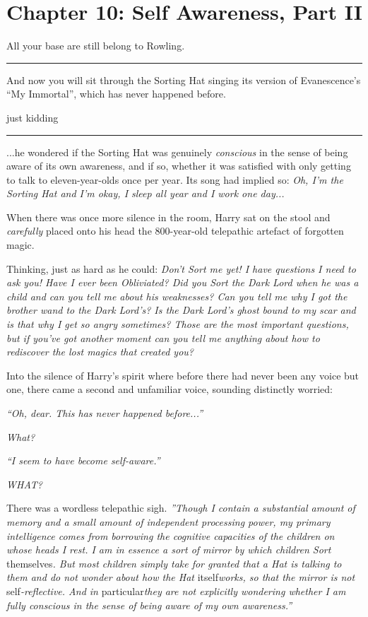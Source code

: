 \chapter{Chapter 10: Self Awareness, Part II}
All your base are still belong to Rowling.

\begin{center}\rule{3in}{0.4pt}\end{center}

And now you will sit through the Sorting Hat singing its version of
Evanescence's ``My Immortal'', which has never happened before.

just kidding

\begin{center}\rule{3in}{0.4pt}\end{center}

...he wondered if the Sorting Hat was genuinely \emph{conscious} in
the sense of being aware of its own awareness, and if so, whether it was
satisfied with only getting to talk to eleven-year-olds once per year.
Its song had implied so: \emph{Oh, I'm the Sorting Hat and I'm okay, I
sleep all year and I work one day...}

When there was once more silence in the room, Harry sat on the stool and
\emph{carefully} placed onto his head the 800-year-old telepathic
artefact of forgotten magic.

Thinking, just as hard as he could: \emph{Don't Sort me yet! I have
questions I need to ask you! Have I ever been Obliviated? Did you Sort
the Dark Lord when he was a child and can you tell me about his
weaknesses? Can you tell me why I got the brother wand to the Dark
Lord's? Is the Dark Lord's ghost bound to my scar and is that why I get
so angry sometimes? Those are the most important questions, but if
you've got another moment can you tell me anything about how to
rediscover the lost magics that created you?}

Into the silence of Harry's spirit where before there had never been any
voice but one, there came a second and unfamiliar voice, sounding
distinctly worried:

\emph{``Oh, dear. This has never happened before...''}

\emph{What?}

\emph{``I seem to have become self-aware.''}

\emph{WHAT?}

There was a wordless telepathic sigh. \emph{''Though I contain a
substantial amount of memory and a small amount of independent
processing power, my primary intelligence comes from borrowing the
cognitive capacities of the children on whose heads I rest. I am in
essence a sort of mirror by which children Sort} themselves\emph{. But
most children simply take for granted that a Hat is talking to them and
do not wonder about how the Hat} itself\emph{works, so that the mirror
is not} self\emph{-reflective. And in} particular\emph{they are not
explicitly wondering whether I am fully conscious in the sense of being
aware of my own awareness.''}

